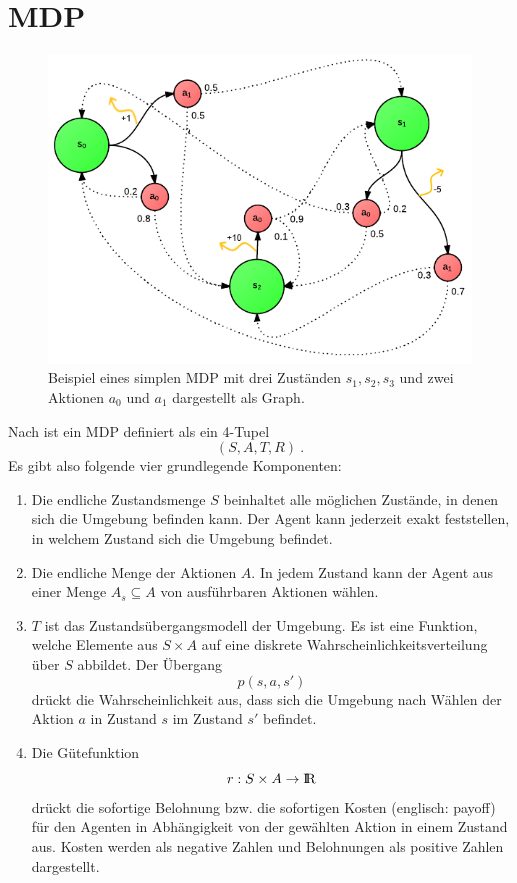 \documentclass[a4paper]{IEEEtran}
\def\IR{\mathrm{I\hspace{-2pt}R}} %
\begin{document}
\section{MDP}
\begin{figure}[ht]
	\centering
	\includegraphics[scale=0.42]{images/MDP_example.png}
	\caption{Beispiel eines simplen MDP mit drei Zuständen $s_1, s_2, s_3$ und zwei Aktionen $a_0$ und $a_1$ dargestellt als Graph.}
	\label{fig:MDP_example} %
\end{figure}
Nach \cite{cassandra1995acting} ist ein MDP definiert als ein 4-Tupel
\begin{equation}
	(S, A, T, R) \ .
\end{equation}
Es gibt also folgende vier grundlegende Komponenten:
\begin{enumerate}
	\item Die endliche Zustandsmenge $S$ beinhaltet alle möglichen Zustände, in denen sich die Umgebung befinden kann. Der Agent kann jederzeit exakt feststellen, in welchem Zustand sich die Umgebung befindet.
	\item Die endliche Menge der Aktionen $A$. In jedem Zustand kann der Agent aus einer Menge $A_s \subseteq A$ von ausführbaren Aktionen wählen.
	\item $T$ ist das Zustandsübergangsmodell der Umgebung. Es ist eine Funktion, welche Elemente aus $S \times A$ auf eine diskrete Wahrscheinlichkeitsverteilung über $S$ abbildet. Der Übergang
	\begin{equation}
		p(s, a, s')
	\end{equation}
	drückt die Wahrscheinlichkeit aus, dass sich die Umgebung nach Wählen der Aktion $a$ in Zustand $s$ im Zustand $s'$ befindet.
	\item Die Gütefunktion
	\begin{equation}
		r: S \times A \rightarrow \IR
		\label{eq:payoff}
	\end{equation}
	drückt die sofortige Belohnung bzw. die sofortigen Kosten (englisch: payoff) für den Agenten in Abhängigkeit von der gewählten Aktion in einem Zustand aus. Kosten werden als negative Zahlen und Belohnungen als positive Zahlen dargestellt.
\end{enumerate}
\end{document}
